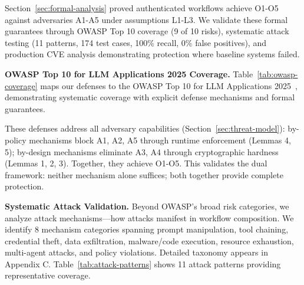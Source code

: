 Section~\ref{sec:formal-analysis} proved authenticated workflows achieve O1-O5 against adversaries A1-A5 under assumptions L1-L3. We validate these formal guarantees through OWASP Top 10 coverage (9 of 10 risks), systematic attack testing (11 patterns, 174 test cases, 100\% recall, 0\% false positives), and production CVE analysis demonstrating protection where baseline systems failed.

\noindent\textbf{OWASP Top 10 for LLM Applications 2025 Coverage.} Table~\ref{tab:owasp-coverage} maps our defenses to the OWASP Top 10 for LLM Applications 2025~\cite{owasp-llm-2025}, demonstrating systematic coverage with explicit defense mechanisms and formal guarantees.


These defenses address all adversary capabilities (Section~\ref{sec:threat-model}): by-policy mechanisms block A1, A2, A5 through runtime enforcement (Lemmas 4, 5); by-design mechanisms eliminate A3, A4 through cryptographic hardness (Lemmas 1, 2, 3). Together, they achieve O1-O5. This validates the dual framework: neither mechanism alone suffices; both together provide complete protection.

\noindent\textbf{Systematic Attack Validation.} Beyond OWASP's broad risk categories, we analyze attack mechanisms—how attacks manifest in workflow composition. We identify 8 mechanism categories spanning prompt manipulation, tool chaining, credential theft, data exfiltration, malware/code execution, resource exhaustion, multi-agent attacks, and policy violations. Detailed taxonomy appears in Appendix C. Table~\ref{tab:attack-patterns} shows 11 attack patterns providing representative coverage.

